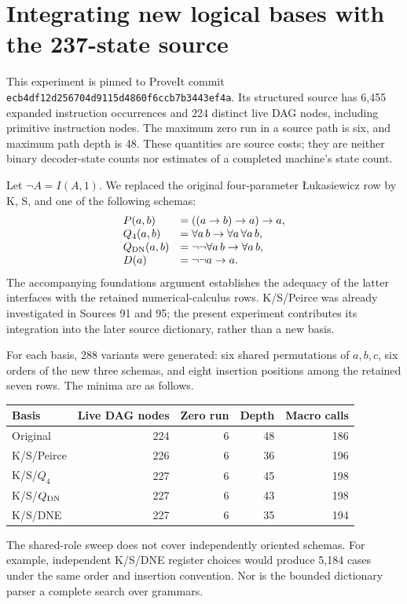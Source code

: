 \section{Integrating new logical bases with the 237-state source}
\label{sec:source-basis-integration}

This experiment is pinned to ProveIt commit
\texttt{ecb4df12d256704d9115d4860f6ccb7b3443ef4a}.
Its structured source has 6,455 expanded instruction occurrences and 224
distinct live DAG nodes, including primitive instruction nodes.  The maximum
zero run in a source path is six, and maximum path depth is 48.  These quantities
are source costs; they are neither binary decoder-state counts nor estimates
of a completed machine's state count.

Let $\neg A=I(A,1)$.  We replaced the original four-parameter
\L{}ukasiewicz row by K, S, and one of the following schemas:
\[
\begin{array}{ll}
P(a,b)&=((a\to b)\to a)\to a,\\
Q_4(a,b)&=\forall a\,b\to\forall a\,\forall a\,b,\\
Q_{\rm DN}(a,b)&=\neg\neg\forall a\,b\to\forall a\,b,\\
D(a)&=\neg\neg a\to a.
\end{array}
\]
The accompanying foundations argument establishes the adequacy of the latter
interfaces with the retained numerical-calculus rows.  K/S/Peirce was already
investigated in Sources 91 and 95; the present experiment contributes its
integration into the later source dictionary, rather than a new basis.

For each basis, 288 variants were generated: six shared permutations of
$a,b,c$, six orders of the new three schemas, and eight insertion positions
among the retained seven rows.  The minima are as follows.
\begin{center}
\begin{tabular}{lrrrr}
\hline
Basis & Live DAG nodes & Zero run & Depth & Macro calls\\
\hline
Original &224&6&48&186\\
K/S/Peirce&226&6&36&196\\
K/S/$Q_4$&227&6&45&198\\
K/S/$Q_{\rm DN}$&227&6&43&198\\
K/S/DNE&227&6&35&194\\
\hline
\end{tabular}
\end{center}
The shared-role sweep does not cover independently oriented schemas.  For
example, independent K/S/DNE register choices would produce 5,184 cases under
the same order and insertion convention.  Nor is the bounded dictionary parser
a complete search over grammars.

